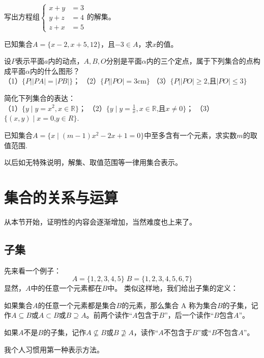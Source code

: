 \documentclass[lang=cn,math=cm,chinesefont=nofont,11pt,scheme=chinese]{elegantbook}
\begin{document}
\begin{exercise}\label{exer:5}
  写出方程组$\left.\left\{\begin{aligned}x+y&=3\\y+z&=4\\z+x&=5\end{aligned}\right.\right.$的解集。
\end{exercise}

\begin{exercise}\label{exer:6}
  已知集合$A=\{x-2,x+5,12\}$，且$-3\in A$，求$x$的值。
\end{exercise}

\begin{exercise}\label{exer:7}
  设$P$表示平面$a$内的动点，$A,B,O$分别是平面$\alpha$内的三个定点，属于下列集合的点构成平面$\alpha$内的什么图形？\\
  （1）$\{P||PA|=|PB|\}$；
  （2）$\{P||PO|=3\text{cm}\}$
  （3）$\{P||PO|\geqslant2\text{,且}|PO|\leqslant3\}$
\end{exercise}

\begin{exercise}\label{exer:8}
  简化下列集合的表达：\\
  （1）$\{y\mid y=x^2,x\in\mathbb{R}\}$；
  （2）$\{y\mid y=\frac{1}{x},x\in\mathbb{R}\text{,且}x\neq0\}$；
  （3）$\{(x,y)\mid x=0\text{,}y\in R\}$.
\end{exercise}

\begin{exercise}\label{exer:9}
  已知集合$A=\{x\mid(m-1)x^2-2x+1=0\}$中至多含有一个元素，求实数$m$的取值范围.
\end{exercise}
\begin{remark}
  以后如无特殊说明，解集、取值范围等一律用集合表示。
\end{remark}

\section{集合的关系与运算}
从本节开始，证明性的内容会逐渐增加，当然难度也上来了。
\subsection{子集}
先来看一个例子：$$A=\{1,2,3,4,5\}\;B=\{1,2,3,4,5,6,7\}$$
显然，$A$中的任意一个元素都在$B$中。
类似这样地，我们给出子集的定义：
\begin{definition}[子集]
  如果集合$A$的任意一个元素都是集合$B$的元素，那么集合 A 称为集合$B$的子集，记作$A\subseteq B$或$A\subset B$或$B\supseteq A$。前两个读作“$A$包含于$B$”，后一个读作“$B$包含$A$”。

  如果$A$不是$B$的子集，记作$A\nsubseteq B$或$B\nsupseteq A$，读作“$A$不包含于$B$”或“$B$不包含$A$”。
\end{definition}
我个人习惯用第一种表示方法。
\end{document}

